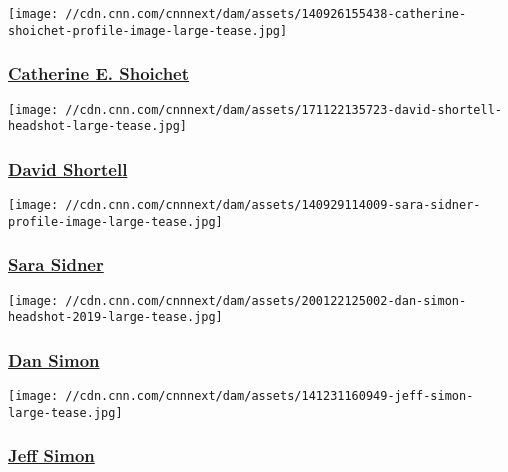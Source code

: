 \href{/profiles/catherine-shoichet-profile}{}

\texttt{[image: //cdn.cnn.com/cnnnext/dam/assets/140926155438-catherine-shoichet-profile-image-large-tease.jpg]}

\hypertarget{catherine-e-shoichet-}{%
\subsubsection{\texorpdfstring{\href{/profiles/catherine-shoichet-profile}{Catherine
E. Shoichet }}{Catherine E. Shoichet }}\label{catherine-e-shoichet-}}

\href{/profiles/david-shortell}{}

\texttt{[image: //cdn.cnn.com/cnnnext/dam/assets/171122135723-david-shortell-headshot-large-tease.jpg]}

\hypertarget{david-shortell}{%
\subsubsection{\texorpdfstring{\href{/profiles/david-shortell}{David
Shortell}}{David Shortell}}\label{david-shortell}}

\href{/profiles/sara-sidner-profile}{}

\texttt{[image: //cdn.cnn.com/cnnnext/dam/assets/140929114009-sara-sidner-profile-image-large-tease.jpg]}

\hypertarget{sara-sidner}{%
\subsubsection{\texorpdfstring{\href{/profiles/sara-sidner-profile}{Sara
Sidner}}{Sara Sidner}}\label{sara-sidner}}

\href{/profiles/dan-simon}{}

\texttt{[image: //cdn.cnn.com/cnnnext/dam/assets/200122125002-dan-simon-headshot-2019-large-tease.jpg]}

\hypertarget{dan-simon}{%
\subsubsection{\texorpdfstring{\href{/profiles/dan-simon}{Dan
Simon}}{Dan Simon}}\label{dan-simon}}

\href{/profiles/jeff-simon}{}

\texttt{[image: //cdn.cnn.com/cnnnext/dam/assets/141231160949-jeff-simon-large-tease.jpg]}

\hypertarget{jeff-simon}{%
\subsubsection{\texorpdfstring{\href{/profiles/jeff-simon}{Jeff
Simon}}{Jeff Simon}}\label{jeff-simon}}

